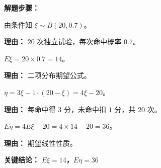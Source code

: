 \begin{examplebox}
	\textbf{\textcolor{CExample}{解题步骤：}}
	\begin{description}[style=nextline, leftmargin=2.8em, labelsep=0.5em, itemsep=0.45em]
		\item[\textbf{第一步（分布判断）：}] 由条件知 $\xi\sim B(20,0.7)$。
		      \par\textbf{理由：} $20$ 次独立试验，每次命中概率 $0.7$。
		\item[\textbf{第二步（期望命中）：}] $E\xi = 20\times0.7 = 14$。
		      \par\textbf{理由：} 二项分布期望公式。
		\item[\textbf{第三步（得分函数）：}] $\eta = 3\xi - 1\cdot(20-\xi) = 4\xi - 20$。
		      \par\textbf{理由：} 每命中得 $3$ 分，未命中扣 $1$ 分，共 $20$ 次。
		\item[\textbf{第四步（求得分期望）：}] $E\eta = 4E\xi - 20 = 4\times14 - 20 = 36$。
		      \par\textbf{理由：} 期望线性性质。
	\end{description}

	\textbf{\textcolor{CExample}{关键结论：}} \textbf{$E\xi=14$，$E\eta=36$}
\end{examplebox}